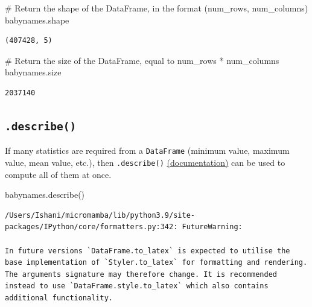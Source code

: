 \documentclass[
  letterpaper,
  DIV=11,
  numbers=noendperiod]{scrreprt}
\newenvironment{Shaded}{\begin{snugshade}}{\end{snugshade}}
\newcommand{\CommentTok}[1]{\textcolor[rgb]{0.37,0.37,0.37}{#1}}
\newcommand{\NormalTok}[1]{\textcolor[rgb]{0.00,0.23,0.31}{#1}}
\begin{document}
\begin{Shaded}
\begin{Highlighting}[]
\CommentTok{\# Return the shape of the DataFrame, in the format (num\_rows, num\_columns)}
\NormalTok{babynames.shape}
\end{Highlighting}
\end{Shaded}

\begin{verbatim}
(407428, 5)
\end{verbatim}

\begin{Shaded}
\begin{Highlighting}[]
\CommentTok{\# Return the size of the DataFrame, equal to num\_rows * num\_columns}
\NormalTok{babynames.size}
\end{Highlighting}
\end{Shaded}

\begin{verbatim}
2037140
\end{verbatim}

\hypertarget{describe}{%
\subsection{\texorpdfstring{\texttt{.describe()}}{.describe()}}\label{describe}}

If many statistics are required from a \texttt{DataFrame} (minimum
value, maximum value, mean value, etc.), then \texttt{.describe()}
\href{https://pandas.pydata.org/docs/reference/api/pandas.DataFrame.describe.html}{(documentation)}
can be used to compute all of them at once.

\begin{Shaded}
\begin{Highlighting}[]
\NormalTok{babynames.describe()}
\end{Highlighting}
\end{Shaded}

\begin{verbatim}
/Users/Ishani/micromamba/lib/python3.9/site-packages/IPython/core/formatters.py:342: FutureWarning:

In future versions `DataFrame.to_latex` is expected to utilise the base implementation of `Styler.to_latex` for formatting and rendering. The arguments signature may therefore change. It is recommended instead to use `DataFrame.style.to_latex` which also contains additional functionality.
\end{verbatim}
\end{document}
